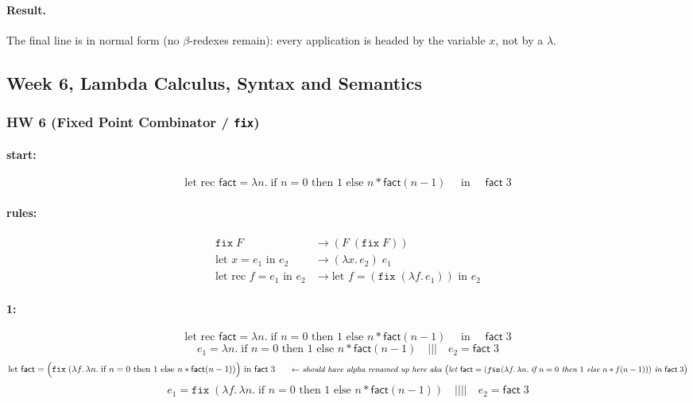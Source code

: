 \documentclass{article}
\theoremstyle{theorem}
\theoremstyle{definition}
\theoremstyle{remark}
\begin{document}
\paragraph{Result.}
The final line is in normal form (no $\beta$-redexes remain): every application is headed by the variable \(x\), not by a $\lambda$.

\subsection{Week 6, Lambda Calculus, Syntax and Semantics}
\subsubsection*{HW 6 (Fixed Point Combinator / \texttt{fix})}

\paragraph{start:}
\[
\text{let rec } \mathsf{fact} = \lambda n.\; \text{if } n=0 \text{ then } 1 \text{ else } n * \mathsf{fact}(n-1)
\quad \text{ in } \quad \mathsf{fact}\;3
\]

\paragraph{rules:}
\[
\begin{aligned}
\texttt{fix}\;F &\to (F\;(\texttt{fix}\;F)) \\
\text{let } x = e_1 \text{ in } e_2 &\to (\lambda x.\,e_2)\;e_1 \\
\text{let rec } f = e_1 \text{ in } e_2 &\to \text{let } f = (\texttt{fix}\;(\lambda f.\, e_1)) \text{ in } e_2
\end{aligned}
\]

\paragraph{1:}
\[
\text{let rec } \mathsf{fact} = \lambda n.\; \text{if } n=0 \text{ then } 1 \text{ else } n * \mathsf{fact}(n-1)
\quad \text{ in } \quad \mathsf{fact}\;3
\]
\[
e_1 = \lambda n.\; \text{if } n=0 \text{ then } 1 \text{ else } n * \mathsf{fact}(n-1)
\quad\big|\big|\big|\quad
e_2 = \mathsf{fact}\;3
\]
\[
\text{let } \mathsf{fact} = \Big(\texttt{fix}\;(\lambda f.\,\lambda n.\; \text{if } n=0 \text{ then } 1 \text{ else } n * \mathsf{fact}(n-1))\Big) \text{ in } \mathsf{fact}\;3
\quad \textit{\small\;\; \(\leftarrow\) should have alpha renamed up here aka
\(\big(\text{let } \mathsf{fact} = (\texttt{fix}\,(\lambda f.\,\lambda n.\; \text{if } n=0 \text{ then } 1 \text{ else } n * f(n-1))) \text{ in } \mathsf{fact}\;3\big)\)}
\]
\[
e_1 = \texttt{fix}\;(\lambda f.\,\lambda n.\; \text{if } n=0 \text{ then } 1 \text{ else } n * \mathsf{fact}(n-1))
\quad\big|\big|\big|\big|\quad
e_2 = \mathsf{fact}\;3
\]
\end{document}
